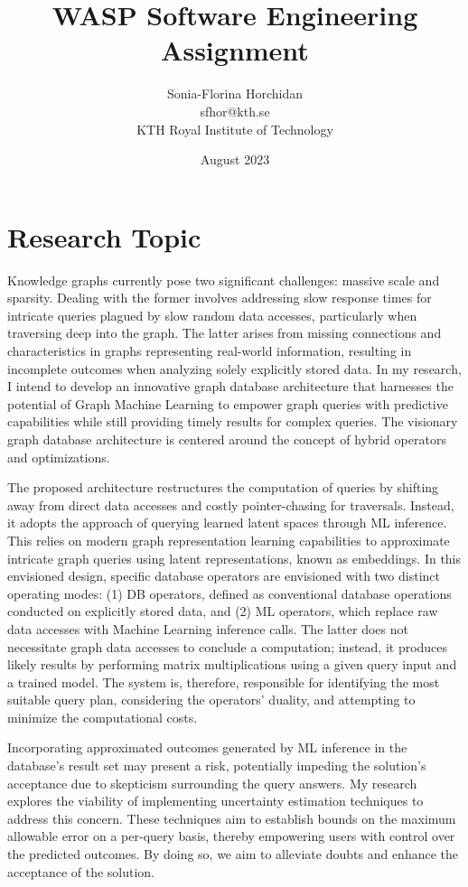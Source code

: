 \documentclass[a4paper, 11pt]{article}
\title{WASP Software Engineering Assignment}
\author{Sonia-Florina Horchidan \\ sfhor@kth.se \\ KTH Royal Institute of Technology}
\date{August 2023}
\begin{document}
\maketitle

\section{Research Topic}

Knowledge graphs currently pose two significant challenges: massive scale and sparsity. Dealing with the former involves addressing slow response times for intricate queries plagued by slow random data accesses, particularly when traversing deep into the graph. The latter arises from missing connections and characteristics in graphs representing real-world information, resulting in incomplete outcomes when analyzing solely explicitly stored data. In my research, I intend to develop an innovative graph database architecture that harnesses the potential of Graph Machine Learning to empower graph queries with predictive capabilities while still providing timely results for complex queries. The visionary graph database architecture is centered around the concept of hybrid operators and optimizations. 

The proposed architecture restructures the computation of queries by shifting away from direct data accesses and costly pointer-chasing for traversals. Instead, it adopts the approach of querying learned latent spaces through ML inference. This relies on modern graph representation learning capabilities to approximate intricate graph queries using latent representations, known as embeddings. In this envisioned design, specific database operators are envisioned with two distinct operating modes:  (1) DB operators, defined as conventional database operations conducted on explicitly stored data, and (2) ML operators, which replace raw data accesses with Machine Learning inference calls. The latter does not necessitate graph data accesses to conclude a computation; instead, it produces likely results by performing matrix multiplications using a given query input and a trained model. The system is, therefore, responsible for identifying the most suitable query plan, considering the operators' duality, and attempting to minimize the computational costs. 

Incorporating approximated outcomes generated by ML inference in the database's result set may present a risk, potentially impeding the solution's acceptance due to skepticism surrounding the query answers. My research explores the viability of implementing uncertainty estimation techniques to address this concern. These techniques aim to establish bounds on the maximum allowable error on a per-query basis, thereby empowering users with control over the predicted outcomes. By doing so, we aim to alleviate doubts and enhance the acceptance of the solution.
\end{document}
